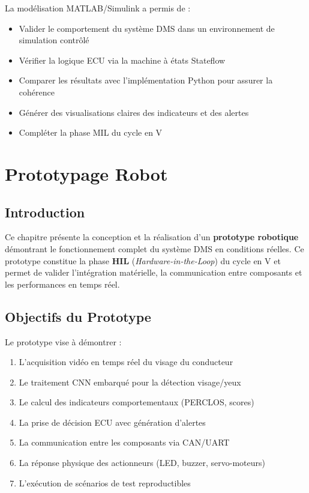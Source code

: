 \documentclass[12pt,a4paper,twoside]{report}
\newcommand{\keyword}[1]{\textbf{\textcolor{stellantisblue}{#1}}}
\begin{document}
La modélisation MATLAB/Simulink a permis de :
\begin{itemize}
    \item Valider le comportement du système DMS dans un environnement de simulation contrôlé
    \item Vérifier la logique ECU via la machine à états Stateflow
    \item Comparer les résultats avec l'implémentation Python pour assurer la cohérence
    \item Générer des visualisations claires des indicateurs et des alertes
    \item Compléter la phase MIL du cycle en V
\end{itemize}


\chapter{Prototypage Robot}

\section{Introduction}

Ce chapitre présente la conception et la réalisation d'un \keyword{prototype robotique} démontrant le fonctionnement complet du système DMS en conditions réelles. Ce prototype constitue la phase \keyword{HIL} (\textit{Hardware-in-the-Loop}) du cycle en V et permet de valider l'intégration matérielle, la communication entre composants et les performances en temps réel.

\section{Objectifs du Prototype}

Le prototype vise à démontrer :
\begin{enumerate}[leftmargin=2cm]
    \item L'acquisition vidéo en temps réel du visage du conducteur
    \item Le traitement CNN embarqué pour la détection visage/yeux
    \item Le calcul des indicateurs comportementaux (PERCLOS, scores)
    \item La prise de décision ECU avec génération d'alertes
    \item La communication entre les composants via CAN/UART
    \item La réponse physique des actionneurs (LED, buzzer, servo-moteurs)
    \item L'exécution de scénarios de test reproductibles
\end{enumerate}
\end{document}
